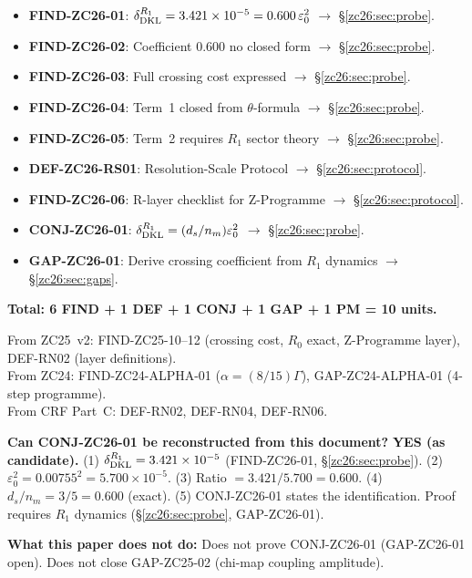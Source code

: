\documentclass[12pt, a4paper]{article}
\begin{document}
\begin{formalbox}[title={Atomic Units Introduced by TASK-ZC26
  (9 units)}]
\begin{itemize}[leftmargin=*,noitemsep]
  \item \textbf{FIND-ZC26-01}: $\delta_{\rm DKL}^{R_1}
    = 3.421\times10^{-5} = 0.600\,\varepsilon_0^2$
    $\to$ \S\ref{zc26:sec:probe}.
  \item \textbf{FIND-ZC26-02}: Coefficient $0.600$ no closed form
    $\to$ \S\ref{zc26:sec:probe}.
  \item \textbf{FIND-ZC26-03}: Full crossing cost expressed
    $\to$ \S\ref{zc26:sec:probe}.
  \item \textbf{FIND-ZC26-04}: Term~1 closed from $\theta$-formula
    $\to$ \S\ref{zc26:sec:probe}.
  \item \textbf{FIND-ZC26-05}: Term~2 requires $R_1$ sector theory
    $\to$ \S\ref{zc26:sec:probe}.
  \item \textbf{DEF-ZC26-RS01}: Resolution-Scale Protocol
    $\to$ \S\ref{zc26:sec:protocol}.
  \item \textbf{FIND-ZC26-06}: R-layer checklist for Z-Programme
    $\to$ \S\ref{zc26:sec:protocol}.
  \item \textbf{CONJ-ZC26-01}: $\delta_{\rm DKL}^{R_1}
    = (d_s/n_m)\varepsilon_0^2$ $\to$ \S\ref{zc26:sec:probe}.
  \item \textbf{GAP-ZC26-01}: Derive crossing coefficient
    from $R_1$ dynamics $\to$ \S\ref{zc26:sec:gaps}.
\end{itemize}
\textbf{Total: 6 FIND + 1 DEF + 1 CONJ + 1 GAP + 1 PM = 10 units.}
\end{formalbox}

\begin{formalbox}[title={Atomic Units Inherited (not modified)}]
From ZC25~v2: FIND-ZC25-10--12 (crossing cost, $R_0$ exact,
  Z-Programme layer), DEF-RN02 (layer definitions).\\
From ZC24: FIND-ZC24-ALPHA-01 ($\alpha=(8/15)\Gamma$),
  GAP-ZC24-ALPHA-01 (4-step programme).\\
From CRF Part~C: DEF-RN02, DEF-RN04, DEF-RN06.
\end{formalbox}

\begin{formalbox}[title={Reconstruction Test (CUIP No-Loss)}]
\textbf{Can CONJ-ZC26-01 be reconstructed from this document?}
\textbf{YES (as candidate).}
(1) $\delta_{\rm DKL}^{R_1} = 3.421\times10^{-5}$ (FIND-ZC26-01,
\S\ref{zc26:sec:probe}).
(2) $\varepsilon_0^2 = 0.00755^2 = 5.700\times10^{-5}$.
(3) Ratio $= 3.421/5.700 = 0.600$.
(4) $d_s/n_m = 3/5 = 0.600$ (exact).
(5) CONJ-ZC26-01 states the identification.
Proof requires $R_1$ dynamics (\S\ref{zc26:sec:probe}, GAP-ZC26-01).

\textbf{What this paper does not do:}
Does not prove CONJ-ZC26-01 (GAP-ZC26-01 open).
Does not close GAP-ZC25-02 (chi-map coupling amplitude).
\end{formalbox}
\end{document}
